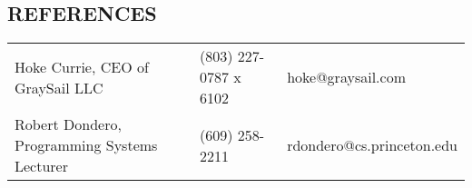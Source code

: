 \documentclass[margin]{res}
\begin{document}
\begin{resume}
\section{REFERENCES}
    \hspace*{-.60in}
    \begin{tabular}{p{2.75in} p{1.25in} p{2in}}
            Hoke Currie, CEO of GraySail LLC & (803) 227-0787 x 6102 & hoke@graysail.com \\
            Robert Dondero, Programming Systems Lecturer & (609) 258-2211 & rdondero@cs.princeton.edu
    \end{tabular}
 

 
\end{resume} 
\end{document}
